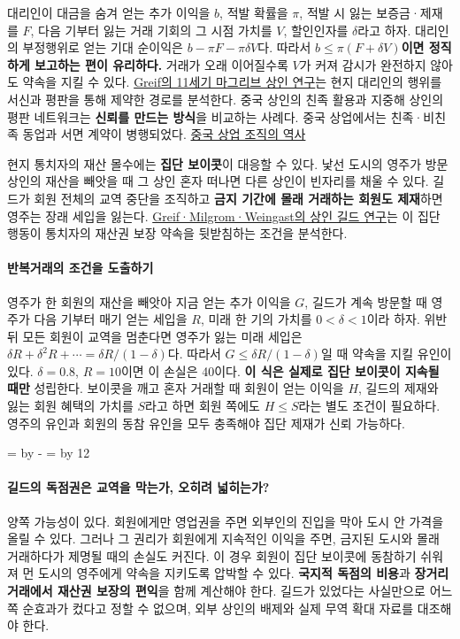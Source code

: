 \documentclass[10pt,a4paper]{article}
\newcommand{\ReserveQuestionSpace}{%
  \par\begingroup
  \dimen0=\pagegoal \advance\dimen0 by -\pagetotal
  \dimen2=\baselineskip \multiply\dimen2 by 12
  \ifdim\dimen0<\dimen2 \newpage\fi
  \endgroup}
\begin{document}
대리인이 대금을 숨겨 얻는 추가 이익을 $b$, 적발 확률을 $\pi$, 적발 시 잃는 보증금·제재를 $F$, 다음 기부터 잃는 거래 기회의 그 시점 가치를 $V$, 할인인자를 $\delta$라고 하자. 대리인의 부정행위로 얻는 기대 순이익은 $b-\pi F-\pi\delta V$다. 따라서 \textbf{$b\leq\pi(F+\delta V)$이면 정직하게 보고하는 편이 유리하다.} 거래가 오래 이어질수록 $V$가 커져 감시가 완전하지 않아도 약속을 지킬 수 있다. \href{https://web.stanford.edu/\%7Eavner/Greif\_Papers/1993\%20Greif\%20AER\%201993.pdf}{Greif의 11세기 마그리브 상인 연구}는 현지 대리인의 행위를 서신과 평판을 통해 제약한 경로를 분석한다. 중국 상인의 친족 활용과 지중해 상인의 평판 네트워크는 \textbf{신뢰를 만드는 방식}을 비교하는 사례다. 중국 상업에서는 친족·비친족 동업과 서면 계약이 병행되었다. \href{https://www.cambridge.org/core/books/cambridge-economic-history-of-china/chinese-business-organization/D92F24332AEF46D21A0AF9483FB8EFF6}{중국 상업 조직의 역사}\par

현지 통치자의 재산 몰수에는 \textbf{집단 보이콧}이 대응할 수 있다. 낯선 도시의 영주가 방문 상인의 재산을 빼앗을 때 그 상인 혼자 떠나면 다른 상인이 빈자리를 채울 수 있다. 길드가 회원 전체의 교역 중단을 조직하고 \textbf{금지 기간에 몰래 거래하는 회원도 제재}하면 영주는 장래 세입을 잃는다. \href{https://doi.org/10.1086/261953}{Greif·Milgrom·Weingast의 상인 길드 연구}는 이 집단 행동이 통치자의 재산권 보장 약속을 뒷받침하는 조건을 분석한다.\par

\paragraph{반복거래의 조건을 도출하기}

영주가 한 회원의 재산을 빼앗아 지금 얻는 추가 이익을 $G$, 길드가 계속 방문할 때 영주가 다음 기부터 매기 얻는 세입을 $R$, 미래 한 기의 가치를 $0<\delta<1$이라 하자. 위반 뒤 모든 회원이 교역을 멈춘다면 영주가 잃는 미래 세입은 $\delta R+\delta^2R+\cdots=\delta R/(1-\delta)$다. 따라서 $G\leq\delta R/(1-\delta)$일 때 약속을 지킬 유인이 있다. $\delta=0.8$, $R=10$이면 이 손실은 40이다. \textbf{이 식은 실제로 집단 보이콧이 지속될 때만} 성립한다. 보이콧을 깨고 혼자 거래할 때 회원이 얻는 이익을 $H$, 길드의 제재와 잃는 회원 혜택의 가치를 $S$라고 하면 회원 쪽에도 $H\leq S$라는 별도 조건이 필요하다. 영주의 유인과 회원의 동참 유인을 모두 충족해야 집단 제재가 신뢰 가능하다.\par

\ReserveQuestionSpace
\paragraph{길드의 독점권은 교역을 막는가, 오히려 넓히는가?}
양쪽 가능성이 있다. 회원에게만 영업권을 주면 외부인의 진입을 막아 도시 안 가격을 올릴 수 있다. 그러나 그 권리가 회원에게 지속적인 이익을 주면, 금지된 도시와 몰래 거래하다가 제명될 때의 손실도 커진다. 이 경우 회원이 집단 보이콧에 동참하기 쉬워져 먼 도시의 영주에게 약속을 지키도록 압박할 수 있다. \textbf{국지적 독점의 비용}과 \textbf{장거리 거래에서 재산권 보장의 편익}을 함께 계산해야 한다. 길드가 있었다는 사실만으로 어느 쪽 순효과가 컸다고 정할 수 없으며, 외부 상인의 배제와 실제 무역 확대 자료를 대조해야 한다.\par
\end{document}
